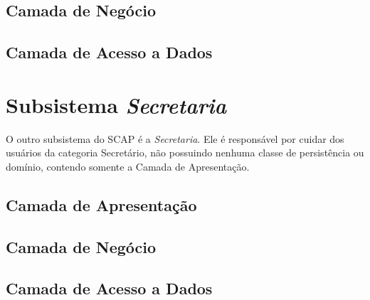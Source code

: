 

\subsection{Camada de Negócio}
\label{subsec-arquitetura-negocio-nucleo}



\subsection{Camada de Acesso a Dados}
\label{subsec-arquitetura-dados-nucleo}



\section{Subsistema \textit{Secretaria}}

O outro subsistema do SCAP é a \textit{Secretaria}. Ele é responsável por cuidar  dos usuários da categoria Secretário, não possuindo nenhuma classe de persistência ou domínio, contendo somente a Camada de Apresentação.

\subsection{Camada de Apresentação}
\label{subsec-arquitetura-apresentacao-secretaria}


\subsection{Camada de Negócio}
\label{subsec-arquitetura-negocio-nucleo-secretaria}


\subsection{Camada de Acesso a Dados}
\label{subsec-arquitetura-dados-nucleo-secretaria}

